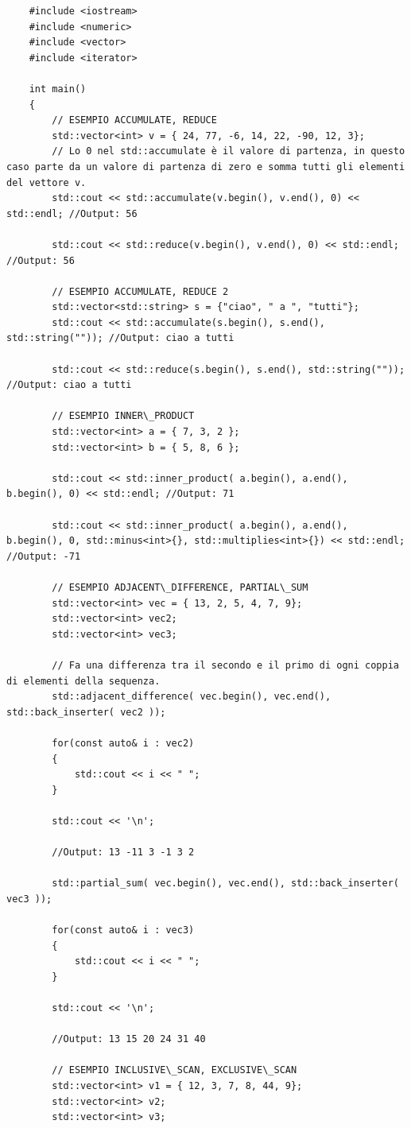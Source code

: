 \begin{lstlisting}
	#include <iostream>
	#include <numeric>
	#include <vector>
	#include <iterator>
	
	int main()
	{
		// ESEMPIO ACCUMULATE, REDUCE
		std::vector<int> v = { 24, 77, -6, 14, 22, -90, 12, 3};
		// Lo 0 nel std::accumulate è il valore di partenza, in questo caso parte da un valore di partenza di zero e somma tutti gli elementi del vettore v.
		std::cout << std::accumulate(v.begin(), v.end(), 0) << std::endl; //Output: 56
		
		std::cout << std::reduce(v.begin(), v.end(), 0) << std::endl; //Output: 56
		
		// ESEMPIO ACCUMULATE, REDUCE 2
		std::vector<std::string> s = {"ciao", " a ", "tutti"};
		std::cout << std::accumulate(s.begin(), s.end(), std::string("")); //Output: ciao a tutti 
		
		std::cout << std::reduce(s.begin(), s.end(), std::string("")); //Output: ciao a tutti 
		
		// ESEMPIO INNER\_PRODUCT
		std::vector<int> a = { 7, 3, 2 };
		std::vector<int> b = { 5, 8, 6 };
		
		std::cout << std::inner_product( a.begin(), a.end(), b.begin(), 0) << std::endl; //Output: 71
		
		std::cout << std::inner_product( a.begin(), a.end(), b.begin(), 0, std::minus<int>{}, std::multiplies<int>{}) << std::endl; //Output: -71
		
		// ESEMPIO ADJACENT\_DIFFERENCE, PARTIAL\_SUM
		std::vector<int> vec = { 13, 2, 5, 4, 7, 9};
		std::vector<int> vec2;
		std::vector<int> vec3;
		
		// Fa una differenza tra il secondo e il primo di ogni coppia di elementi della sequenza. 
		std::adjacent_difference( vec.begin(), vec.end(), std::back_inserter( vec2 ));
		
		for(const auto& i : vec2)
		{
			std::cout << i << " ";
		}
		
		std::cout << '\n';
		
		//Output: 13 -11 3 -1 3 2 
		
		std::partial_sum( vec.begin(), vec.end(), std::back_inserter( vec3 ));
		
		for(const auto& i : vec3)
		{
			std::cout << i << " ";
		}
		
		std::cout << '\n';
		
		//Output: 13 15 20 24 31 40
		
		// ESEMPIO INCLUSIVE\_SCAN, EXCLUSIVE\_SCAN
		std::vector<int> v1 = { 12, 3, 7, 8, 44, 9};
		std::vector<int> v2;
		std::vector<int> v3;
		

\end{lstlisting}
